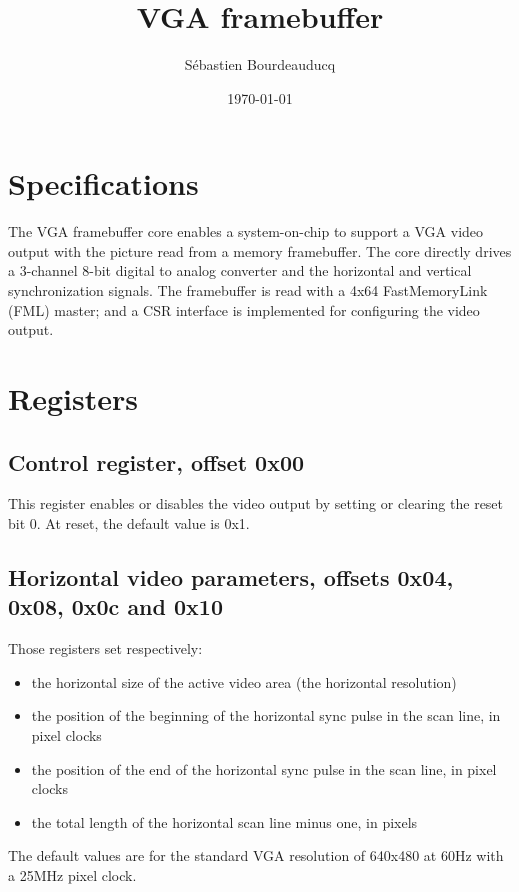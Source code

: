 \documentclass[a4paper,11pt]{article}
\title{VGA framebuffer}
\author{S\'ebastien Bourdeauducq}
\date{\today}
\begin{document}
\setlength{\parindent}{0pt}
\setlength{\parskip}{5pt}
\maketitle{}
\section{Specifications}
The VGA framebuffer core enables a system-on-chip to support a VGA video output with the picture read from a memory framebuffer.
The core directly drives a 3-channel 8-bit digital to analog converter and the horizontal and vertical synchronization signals.
The framebuffer is read with a 4x64 FastMemoryLink (FML) master; and a CSR interface is implemented for configuring the video output.

\section{Registers}
\subsection{Control register, offset 0x00}
This register enables or disables the video output by setting or clearing the reset bit 0. At reset, the default value is 0x1.

\subsection{Horizontal video parameters, offsets 0x04, 0x08, 0x0c and 0x10}
Those registers set respectively:
\begin{itemize}
\item the horizontal size of the active video area (the horizontal resolution)
\item the position of the beginning of the horizontal sync pulse in the scan line, in pixel clocks
\item the position of the end of the horizontal sync pulse in the scan line, in pixel clocks
\item the total length of the horizontal scan line minus one, in pixels
\end{itemize}
The default values are for the standard VGA resolution of 640x480 at 60Hz with a 25MHz pixel clock.
\end{document}
